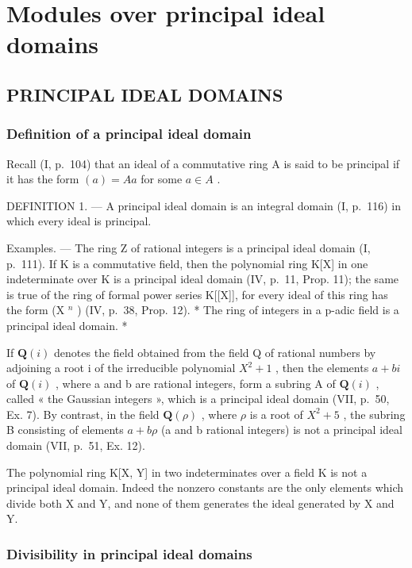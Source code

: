 \chapter{Modules over principal ideal domains}

\section{PRINCIPAL IDEAL DOMAINS}

\subsection{Definition of a principal ideal domain}

Recall (I, p.~104) that an ideal of a commutative ring A is said to be principal if it has the form \((a) = A a\) for some \(a \in A\) .

DEFINITION 1. --- A principal ideal domain is an integral domain (I, p.~116) in which every ideal is principal.

Examples. --- The ring Z of rational integers is a principal ideal domain (I, p.~111). If K is a commutative field, then the polynomial ring K{[}X{]} in one indeterminate over K is a principal ideal domain (IV, p.~11, Prop. 11); the same is true of the ring of formal power series K{[}{[}X{]}{]}, for every ideal of this ring has the form (X \(^{n}\) ) (IV, p.~38, Prop. 12). * The ring of integers in a p-adic field is a principal ideal domain. *

If \(\mathbf{Q}(i)\) denotes the field obtained from the field Q of rational numbers by adjoining a root i of the irreducible polynomial \(X^{2}+1\) , then the elements \(a+bi\) of \(\mathbf{Q}(i)\) , where a and b are rational integers, form a subring A of \(\mathbf{Q}(i)\) , called « the Gaussian integers », which is a principal ideal domain (VII, p.~50, Ex. 7). By contrast, in the field \(\mathbf{Q}(\rho)\) , where \(\rho\) is a root of \(X^{2}+5\) , the subring B consisting of elements \(a+b\rho\) (a and b rational integers) is not a principal ideal domain (VII, p.~51, Ex. 12).

The polynomial ring K{[}X, Y{]} in two indeterminates over a field K is not a principal ideal domain. Indeed the nonzero constants are the only elements which divide both X and Y, and none of them generates the ideal generated by X and Y.

\subsection{Divisibility in principal ideal domains}

